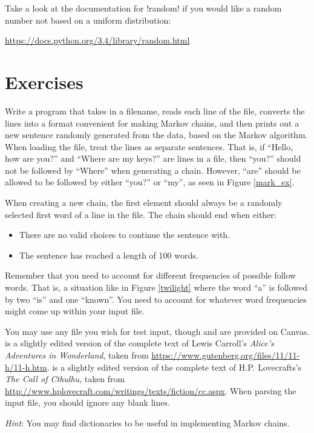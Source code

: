 \documentclass[11pt]{cselabheader}
\begin{document}
Take a look at the documentation for \pythoninline!random! if you would like a
random number not based on a uniform distribution:
\begin{center}
  \url{https://docs.python.org/3.4/library/random.html}
\end{center}

\section{Exercises}
\label{sec:ex}

\begin{ex}[markov.py]
  Write a program that takes in a filename, reads each line of the file,
  converts the lines into a format convenient for making Markov chains, and
  then prints out a new sentence randomly generated from the data, based on
  the Markov algorithm. When loading the file, treat the lines as separate
  sentences. That is, if ``Hello, how are you?'' and ``Where are my keys?''
  are lines in a file, then ``you?'' should not be followed by ``Where'' when
  generating a chain. However, ``are'' should be allowed to be followed by
  either ``you?'' or ``my'', as seen in Figure \ref{mark_ex}.

  When creating a new chain, the first element should always be a randomly
  selected first word of a line in the file. The chain should end when either:
  \begin{itemize}
  \item There are no valid choices to continue the sentence with.
  \item The sentence has reached a length of 100 words.
  \end{itemize}

  Remember that you need to account for different frequencies of possible
  follow words. That is, a situation like in Figure \ref{twilight} where
  the word ``a'' is followed by two ``is'' and one ``known''. You need to
  account for whatever word frequencies might come up within your input file.

  You may use any file you wish for test input, though 
  and  are provided on Canvas.
   is a slightly edited version of the complete text of
  Lewis Carroll's \emph{Alice's Adventures in Wonderland}, taken from
  \url{https://www.gutenberg.org/files/11/11-h/11-h.htm}.
   is a slightly edited version of the complete text of
  H.P. Lovecrafts's \emph{The Call of Cthulhu}, taken from
  \url{http://www.hplovecraft.com/writings/texts/fiction/cc.aspx}.
  When parsing the input file, you should ignore any blank lines.

  \emph{Hint}: You may find dictionaries to be useful in implementing
  Markov chains.
\end{ex}
\end{document}

